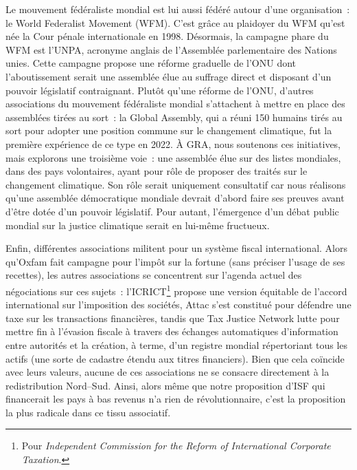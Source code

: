\documentclass[a5paper,french,openany]{memoir}
\begin{document}
Le mouvement fédéraliste mondial est lui aussi fédéré autour d'une organisation~: le World Federalist Movement (WFM). C'est grâce au plaidoyer du WFM qu'est née la Cour pénale internationale en 1998. Désormais, la campagne phare du WFM est l'UNPA, acronyme anglais de l'Assemblée parlementaire des Nations unies. Cette campagne propose une réforme graduelle de l'ONU dont l'aboutissement serait une assemblée élue au suffrage direct et disposant d'un pouvoir législatif contraignant. Plutôt qu'une réforme de l'ONU, d'autres associations du mouvement fédéraliste mondial s'attachent à mettre en place des assemblées tirées au sort~: la Global Assembly, qui a réuni 150 humains tirés au sort pour adopter une position commune sur le changement climatique, fut la première expérience de ce type en 2022. 
À GRA, nous soutenons ces initiatives, mais explorons une troisième voie~: 
une assemblée élue sur des listes mondiales, dans des pays volontaires, ayant pour rôle de proposer des traités sur le changement climatique. 
Son rôle serait uniquement consultatif car nous réalisons qu'une assemblée démocratique mondiale devrait d'abord faire ses preuves avant d'être dotée d'un pouvoir législatif. Pour autant, l'émergence d'un débat public mondial sur la justice climatique serait en lui-même fructueux. 

Enfin, différentes associations militent pour un système fiscal international. Alors qu'Oxfam fait campagne pour l'impôt sur la fortune (sans préciser l'usage de ses recettes), les autres associations se concentrent sur l'agenda actuel des négociations sur ces sujets~: l'ICRICT\footnote{Pour \textit{Independent Commission for the Reform of International Corporate Taxation}.} 
propose une version équitable de l'accord international sur l'imposition des sociétés, Attac s'est constitué pour défendre une taxe sur les transactions financières, tandis que Tax Justice Network lutte pour mettre fin à l'évasion fiscale à travers des échanges automatiques d'information entre autorités et la création, à terme, d'un registre mondial répertoriant tous les actifs (une sorte de cadastre étendu aux titres financiers). Bien que cela coïncide avec leurs valeurs, aucune de ces associations ne se consacre directement à la redistribution Nord--Sud. Ainsi, alors même que notre proposition d'ISF qui financerait les pays à bas revenus n'a rien de révolutionnaire, c'est la proposition la plus radicale dans ce tissu associatif. 
\end{document}
